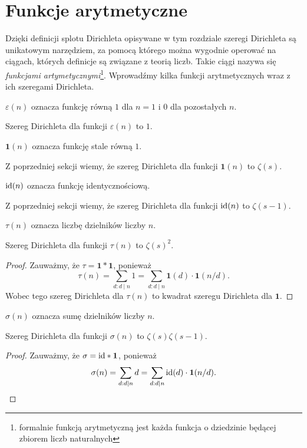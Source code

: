 \documentclass[shortabstract]{imthesis}
\begin{document}
\section{Funkcje arytmetyczne}

Dzięki definicji splotu Dirichleta opisywane w tym rozdziale szeregi Dirichleta są unikatowym narzędziem, za pomocą którego można wygodnie operować na ciągach, których definicje są związane z teorią liczb. Takie ciągi nazywa się \emph{funkcjami artymetycznymi}\footnote{formalnie funkcją arytmetyczną jest każda funkcja o dziedzinie będącej zbiorem liczb naturalnych}. Wprowadźmy kilka funkcji arytmetycznych wraz z ich szeregami Dirichleta.

\begin{definition}
    $\varepsilon(n)$ oznacza funkcję równą $1$ dla $n=1$ i $0$ dla pozostałych $n$.
\end{definition}
Szereg Dirichleta dla funkcji $\varepsilon(n)$ to $1$.

\newcommand{\arithone}{\mathbf{1}}
\begin{definition}
    $\arithone(n)$ oznacza funkcję stale równą $1$.
\end{definition}
Z poprzedniej sekcji wiemy, że szereg Dirichleta dla funkcji $\arithone(n)$ to $\zeta(s)$.

\begin{definition}
    $\text{id}(n)$ oznacza funkcję identycznościową.
\end{definition}
Z poprzedniej sekcji wiemy, że szereg Dirichleta dla funkcji $\text{id}(n)$ to $\zeta(s-1)$.

\begin{definition}
    $\tau(n)$ oznacza liczbę dzielników liczby $n$.
\end{definition}
\begin{remark}
    Szereg Dirichleta dla funkcji $\tau(n)$ to $\zeta(s)^2$.
\end{remark}
\begin{proof}
Zauważmy, że $\tau = \arithone * \arithone$, ponieważ
$$
\tau(n) = \sum_{d : d \mid n} 1 = \sum_{d : d \mid n} \arithone(d) \cdot \arithone(n/d).
$$
Wobec tego szereg Dirichleta dla $\tau(n)$ to kwadrat szeregu Dirichleta dla $\arithone$.
\end{proof}

\begin{definition}
    $\sigma(n)$ oznacza sumę dzielników liczby $n$.
\end{definition}
\begin{remark}
    Szereg Dirichleta dla funkcji $\sigma(n)$ to $\zeta(s)\zeta(s-1)$.
\end{remark}
\begin{proof}
Zauważmy, że $\sigma = \id * \arithone$, ponieważ
$$
\sigma(n) = \sum_{d : d \mid n} d = \sum_{d : d \mid n} \id(d) \cdot \arithone(n/d).
$$
\end{proof}
\end{document}
